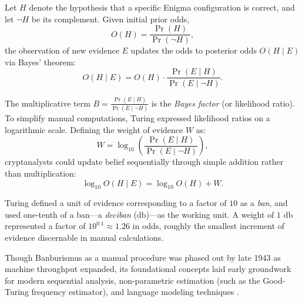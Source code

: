 Let $H$ denote the hypothesis that a specific Enigma configuration is correct, and let $\neg H$ be its complement. Given initial prior odds,
\begin{equation}
O(H) = \frac{\Pr(H)}{\Pr(\neg H)},
\end{equation}
the observation of new evidence $E$ updates the odds to posterior odds $O(H \mid E)$ via Bayes' theorem:
\begin{equation}
O(H \mid E) = O(H) \cdot \frac{\Pr(E \mid H)}{\Pr(E \mid \neg H)}.
\end{equation}

The multiplicative term $B = \frac{\Pr(E \mid H)}{\Pr(E \mid \neg H)}$ is the \emph{Bayes factor} (or likelihood ratio). To simplify manual computations, Turing expressed likelihood ratios on a logarithmic scale. Defining the weight of evidence $W$ as:
\begin{equation}
W = \log_{10} \left( \frac{\Pr(E \mid H)}{\Pr(E \mid \neg H)} \right),
\end{equation}
cryptanalysts could update belief sequentially through simple addition rather than multiplication:
\begin{equation}
\log_{10} O(H \mid E) = \log_{10} O(H) + W.
\end{equation}

Turing defined a unit of evidence corresponding to a factor of $10$ as a \emph{ban}, and used one-tenth of a ban—a \emph{deciban} ($\text{db}$)—as the working unit. A weight of $1\text{ db}$ represented a factor of $10^{0.1} \approx 1.26$ in odds, roughly the smallest increment of evidence discernable in manual calculations.

\vspace{5mm}

Though Banburismus as a manual procedure was phased out by late 1943 as machine throughput expanded, its foundational concepts laid early groundwork for modern sequential analysis, non-parametric estimation (such as the Good-Turing frequency estimator), and language modeling techniques \cite{zabell2023secret,gale1995good,mcallester2000convergence,avasthi2021processing}.



